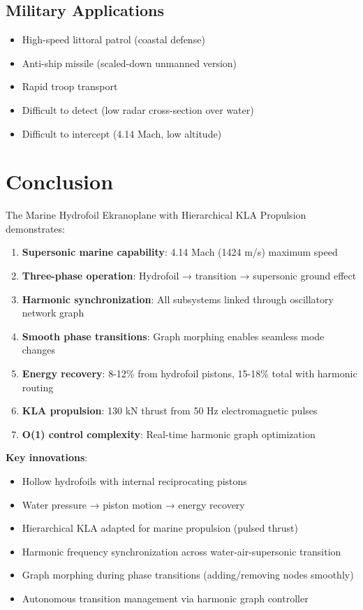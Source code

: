 \documentclass[12pt,a4paper]{article}
\begin{document}
\subsection{Military Applications}

\begin{itemize}
\item High-speed littoral patrol (coastal defense)
\item Anti-ship missile (scaled-down unmanned version)
\item Rapid troop transport
\item Difficult to detect (low radar cross-section over water)
\item Difficult to intercept (4.14 Mach, low altitude)
\end{itemize}

\section{Conclusion}

The Marine Hydrofoil Ekranoplane with Hierarchical KLA Propulsion demonstrates:

\begin{enumerate}
\item \textbf{Supersonic marine capability}: 4.14 Mach (1424 m/s) maximum speed
\item \textbf{Three-phase operation}: Hydrofoil → transition → supersonic ground effect
\item \textbf{Harmonic synchronization}: All subsystems linked through oscillatory network graph
\item \textbf{Smooth phase transitions}: Graph morphing enables seamless mode changes
\item \textbf{Energy recovery}: 8-12\% from hydrofoil pistons, 15-18\% total with harmonic routing
\item \textbf{KLA propulsion}: 130 kN thrust from 50 Hz electromagnetic pulses
\item \textbf{O(1) control complexity}: Real-time harmonic graph optimization
\end{enumerate}

\textbf{Key innovations}:
\begin{itemize}
\item Hollow hydrofoils with internal reciprocating pistons
\item Water pressure → piston motion → energy recovery
\item Hierarchical KLA adapted for marine propulsion (pulsed thrust)
\item Harmonic frequency synchronization across water-air-supersonic transition
\item Graph morphing during phase transitions (adding/removing nodes smoothly)
\item Autonomous transition management via harmonic graph controller
\end{itemize}
\end{document}
